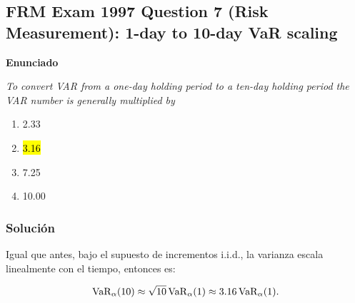 ﻿\subsection{FRM Exam 1997 Question 7 (Risk Measurement): 1-day to 10-day VaR scaling}

\textbf{Enunciado}

\emph{To convert VAR from a one-day holding period to a ten-day holding period the VAR number is generally multiplied by}   
\begin{enumerate}[label=\alph*.]
\item 2.33
\item \hl{3.16}
\item 7.25
\item 10.00
\end{enumerate}

\subsubsection*{Solución}

Igual que antes, bajo el supuesto de incrementos i.i.d., la varianza escala linealmente con el tiempo, entonces es:

\[
\mathrm{VaR}_\alpha(10)\approx \sqrt{10}\,\mathrm{VaR}_\alpha(1)\approx 3.16\,\mathrm{VaR}_\alpha(1).
\]











